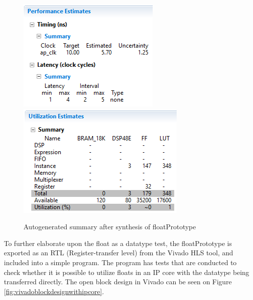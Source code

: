 \begin{figure}[H]
	\centering
	\includegraphics[width=0.428\linewidth]{diagram/floatPrototype_performance_summary}
	\includegraphics[width=0.5\linewidth]{diagram/floatPrototype_synthesis_summary}
	\caption{Autogenerated summary after synthesis of floatPrototype}
	\label{fig:floatprototypesynthesissummary}
\end{figure}


To further elaborate upon the float as a datatype test, the floatPrototype is exported as an RTL (Register-transfer level) from the Vivado HLS tool, and included into a simple program. The program has tests that are conducted to check whether it is possible to utilize floats in an IP core with the datatype being transferred directly. The open block design in Vivado can be seen on Figure \ref{fig:vivadoblockdesignwithipcore}.\\

